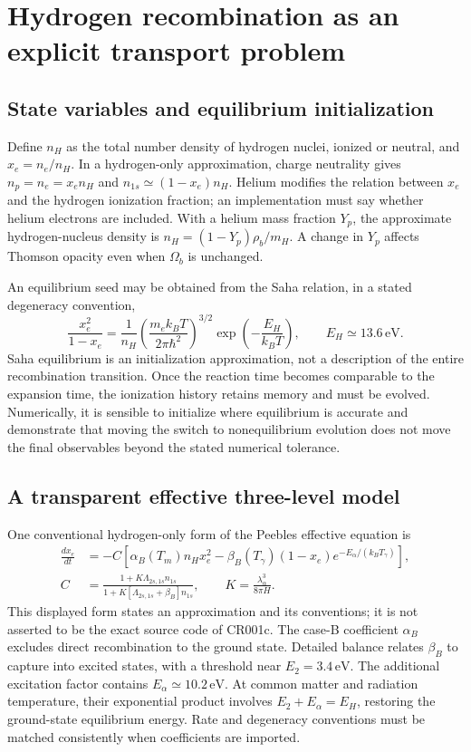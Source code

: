 \section{Hydrogen recombination as an explicit transport problem}
\subsection{State variables and equilibrium initialization}

Define $n_H$ as the total number density of hydrogen nuclei, ionized or neutral, and $x_e=n_e/n_H$. In a hydrogen-only approximation, charge neutrality gives $n_p=n_e=x_en_H$ and $n_{1s}\simeq(1-x_e)n_H$. Helium modifies the relation between $x_e$ and the hydrogen ionization fraction; an implementation must say whether helium electrons are included. With a helium mass fraction $Y_p$, the approximate hydrogen-nucleus density is $n_H=(1-Y_p)\rho_b/m_H$. A change in $Y_p$ affects Thomson opacity even when $\Omega_b$ is unchanged.

An equilibrium seed may be obtained from the Saha relation, in a stated degeneracy convention,
\begin{equation}
 \frac{x_e^2}{1-x_e}=\frac{1}{n_H}
 \left(\frac{m_e k_BT}{2\pi\hbar^2}\right)^{3/2}
 \exp\!\left(-\frac{E_H}{k_BT}\right),\qquad E_H\simeq13.6\,\mathrm{eV}.
 \label{c9:saha}
\end{equation}
Saha equilibrium is an initialization approximation, not a description of the entire recombination transition. Once the reaction time becomes comparable to the expansion time, the ionization history retains memory and must be evolved. Numerically, it is sensible to initialize where equilibrium is accurate and demonstrate that moving the switch to nonequilibrium evolution does not move the final observables beyond the stated numerical tolerance.

\subsection{A transparent effective three-level model}

One conventional hydrogen-only form of the Peebles effective equation is
\begin{align}
 \frac{dx_e}{dt}&=-C\left[\alpha_B(T_m)n_Hx_e^2
 -\beta_B(T_\gamma)(1-x_e)e^{-E_\alpha/(k_BT_\gamma)}\right],
 \label{c9:peebles}\\
 C&=\frac{1+K\Lambda_{2s,1s}n_{1s}}
 {1+K[\Lambda_{2s,1s}+\beta_B]n_{1s}},\qquad
 K=\frac{\lambda_\alpha^3}{8\pi H}.
 \label{c9:cfactor}
\end{align}
This displayed form states an approximation and its conventions; it is not asserted to be the exact source code of CR001c. The case-B coefficient $\alpha_B$ excludes direct recombination to the ground state. Detailed balance relates $\beta_B$ to capture into excited states, with a threshold near $E_2=3.4\,\mathrm{eV}$. The additional excitation factor contains $E_\alpha\simeq10.2\,\mathrm{eV}$. At common matter and radiation temperature, their exponential product involves $E_2+E_\alpha=E_H$, restoring the ground-state equilibrium energy. Rate and degeneracy conventions must be matched consistently when coefficients are imported.

